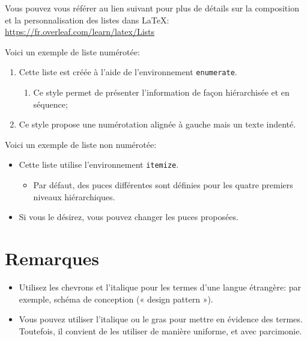 Vous pouvez vous référer au lien suivant pour plus de détails sur la composition et la personnalisation des listes dans \LaTeX : \url{https://fr.overleaf.com/learn/latex/Lists}

\noindent
Voici un exemple de liste numérotée:
\begin{enumerate}
    \item Cette liste est créée à l'aide de l'environnement \verb|enumerate|. 
    \begin{enumerate}
        \item Ce style permet de présenter l'information de façon hiérarchisée et en séquence;
    \end{enumerate}
    \item Ce style propose une numérotation alignée à gauche mais un texte indenté.
\end{enumerate}

\noindent
Voici un exemple de liste non numérotée:
\begin{itemize}
    \item Cette liste utilise l'environnement \verb|itemize|.     
    \begin{itemize}
        \item Par défaut, des puces différentes sont définies pour les quatre premiers niveaux hiérarchiques.
    \end{itemize}
    \item Si vous le désirez, vous pouvez changer les puces proposées.
\end{itemize}


\section{Remarques}
\begin{itemize}
    \item Utilisez les chevrons et l'italique pour les termes d'une langue étrangère: par exemple, schéma de conception (« design pattern »).
    
    \item Vous pouvez utiliser l'italique ou le gras pour mettre en évidence des termes.  Toutefois, il convient de les utiliser de manière uniforme, et avec parcimonie.
\end{itemize}
